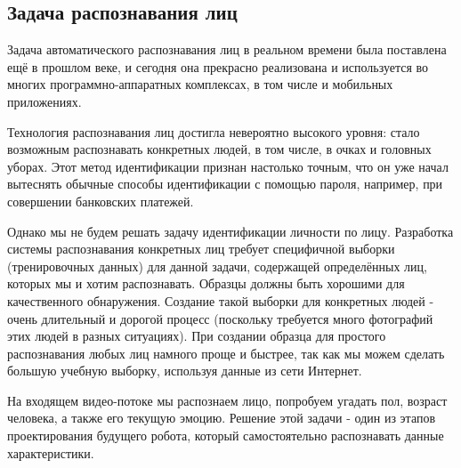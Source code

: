 \documentclass[14pt,a4paper]{scrartcl}
\begin{document}
		
		\subsection{Задача распознавания лиц}
		
			Задача автоматического распознавания лиц в реальном времени была поставлена ещё в прошлом веке, и сегодня она прекрасно реализована и используется во многих программно-аппаратных комплексах, в том числе и мобильных приложениях.
			
			Технология распознавания лиц достигла невероятно высокого уровня: стало возможным распознавать конкретных людей, в том числе, в очках и головных уборах. Этот метод идентификации признан настолько точным, что он уже начал вытеснять обычные способы идентификации с помощью пароля, например, при совершении банковских платежей\cite{bib:Smart_Payment_China}. 
			
			Однако мы не будем решать задачу идентификации личности по лицу. Разработка системы распознавания конкретных лиц требует специфичной выборки (тренировочных данных) для данной задачи, содержащей определённых лиц, которых мы и хотим распознавать. Образцы должны быть хорошими для качественного обнаружения. Создание такой выборки для конкретных людей - очень длительный и дорогой процесс (поскольку требуется много фотографий этих людей в разных ситуациях). При создании образца для простого распознавания любых лиц намного проще и быстрее, так как мы можем сделать большую учебную выборку, используя данные из сети Интернет.
			
			На входящем видео-потоке мы распознаем лицо, попробуем угадать пол, возраст человека, а также его текущую эмоцию. Решение этой задачи - один из этапов проектирования будущего робота, который самостоятельно распознавать данные характеристики\cite{bib:Elise_CPU_Desc}.
		
		
\end{document}

